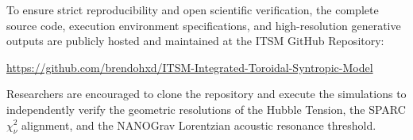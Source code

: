 \documentclass[aps,prd,10pt,twocolumn,superscriptaddress,nofootinbib]{revtex4-2}
\begin{document}
To ensure strict reproducibility and open scientific verification, the complete source code, execution environment specifications, and high-resolution generative outputs are publicly hosted and maintained at the ITSM GitHub Repository:

\begin{center}
\url{https://github.com/brendohxd/ITSM-Integrated-Toroidal-Syntropic-Model}
\end{center}

Researchers are encouraged to clone the repository and execute the simulations to independently verify the geometric resolutions of the Hubble Tension, the SPARC $\chi^2_\nu$ alignment, and the NANOGrav Lorentzian acoustic resonance threshold.

\end{document}

